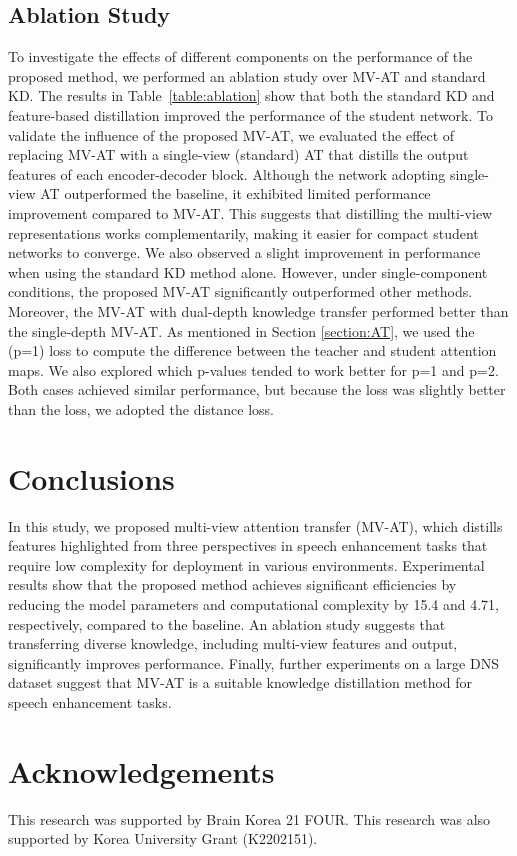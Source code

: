 \documentclass[a4paper]{article}
\begin{document}
\subsection{Ablation Study} \label{section_ablation}
To investigate the effects of different components on the performance of the proposed method, we performed an ablation study over MV-AT and standard KD. The results in Table~\ref{table:ablation} show that both the standard KD and feature-based distillation improved the performance of the student network. To validate the influence of the proposed MV-AT, we evaluated the effect of replacing MV-AT with a single-view (standard) AT that distills the output features of each encoder-decoder block. Although the network adopting single-view AT outperformed the baseline, it exhibited limited performance improvement compared to MV-AT. This suggests that distilling the multi-view representations works complementarily, making it easier for compact student networks to converge. We also observed a slight improvement in performance when using the standard KD method alone. However, under single-component conditions, the proposed MV-AT significantly outperformed other methods. Moreover, the MV-AT with dual-depth knowledge transfer performed better than the single-depth MV-AT. As mentioned in Section \ref{section:AT}, we used the  (p=1) loss to compute the difference between the teacher and student attention maps. We also explored which p-values tended to work better for p=1 and p=2. Both cases achieved similar performance, but because the  loss was slightly better than the  loss, we adopted the  distance loss.
\section{Conclusions}
In this study, we proposed multi-view attention transfer (MV-AT), which distills features highlighted from three perspectives in speech enhancement tasks that require low complexity for deployment in various environments. Experimental results show that the proposed method achieves significant efficiencies by reducing the model parameters and computational complexity by 15.4 and 4.71, respectively, compared to the baseline. An ablation study suggests that transferring diverse knowledge, including multi-view features and output, significantly improves performance. Finally, further experiments on a large DNS dataset suggest that MV-AT is a suitable knowledge distillation method for speech enhancement tasks.
\section{Acknowledgements}
This research was supported by Brain Korea 21 FOUR. This research was also supported by Korea University Grant (K2202151).




\end{document}
